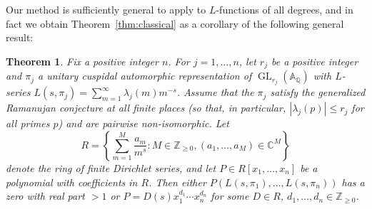 \documentclass[11pt]{amsart}
\newtheorem{theorem}{Theorem}
\theoremstyle{remark}
\numberwithin{theorem}{section}
\numberwithin{equation}{section}
\newcommand{\C}{\mathbb{C}}
\newcommand{\Q}{\mathbb{Q}}
\newcommand{\Z}{\mathbb{Z}}
\DeclareMathOperator{\GL}{GL}
\begin{document}
Our method is sufficiently general to apply to $L$-functions of all
degrees, and in fact we obtain Theorem~\ref{thm:classical} as a corollary
of the following general result:
\begin{theorem}\label{thm:main}
Fix a positive integer $n$. For $j=1,\ldots,n$, let $r_j$ be
a positive integer and $\pi_j$ a unitary cuspidal automorphic
representation of $\GL_{r_j}(\mathbb{A}_\Q)$ with $L$-series
$L(s,\pi_j)=\sum_{m=1}^\infty\lambda_j(m)m^{-s}$.  Assume that the
$\pi_j$ satisfy the generalized Ramanujan conjecture at all finite places
(so that, in particular, $|\lambda_j(p)|\le r_j$ for all primes $p$)
and are pairwise non-isomorphic. Let
$$
R=\left\{\sum_{m=1}^M\frac{a_m}{m^s}:M\in\Z_{\ge0},
(a_1,\ldots,a_M)\in\C^M\right\}
$$
denote the ring of finite Dirichlet series, and let $P\in
R[x_1,\ldots,x_n]$ be a polynomial with coefficients in $R$.
Then either $P(L(s,\pi_1),\ldots,L(s,\pi_n))$ has a zero with real
part $>1$ or $P=D(s)x_1^{d_1}\cdots x_n^{d_n}$ for some $D\in R$,
$d_1,\ldots,d_n\in\Z_{\ge0}$.
\end{theorem}
\end{document}
